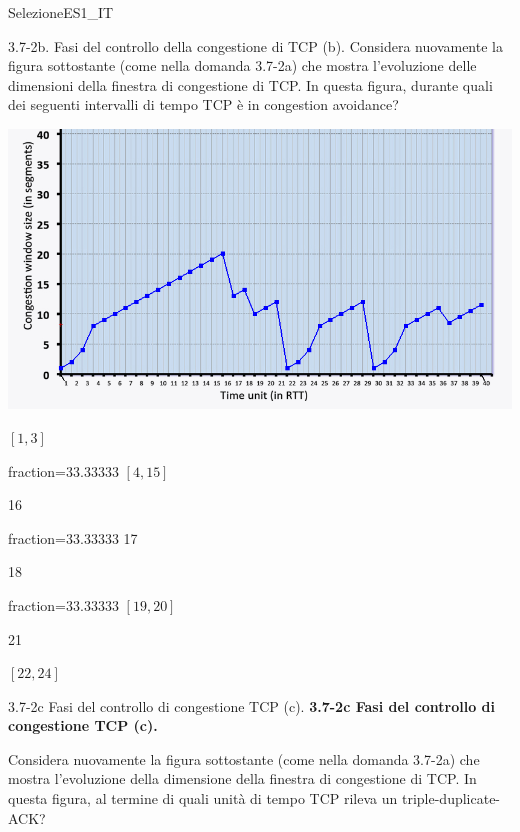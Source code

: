 \documentclass[a4paper]{article}
\begin{document}
\begin{quiz}{SelezioneES1\_IT}
\begin{multi}[points=1,shuffle,multiple]{3.7-2b. Fasi del controllo della congestione di TCP (b).}
Considera nuovamente la figura sottostante (come nella domanda 3.7-2a) che mostra l'evoluzione delle dimensioni della finestra di congestione di TCP. In questa figura, durante quali dei seguenti intervalli di tempo TCP è in congestion avoidance?

\begin{center}
	\includegraphics[width=\linewidth]{figs/tcp_cc_evolution.jpg}
\end{center}
\item $[1,3]$
\item[fraction=33.33333] $[4,15]$
\item 16
\item[fraction=33.33333] 17
\item 18
\item[fraction=33.33333] $[19,20]$
\item 21
\item $[22,24]$
\end{multi}

\begin{multi}[points=1,shuffle,multiple]{3.7-2c Fasi del controllo di congestione TCP (c).}
\textbf{3.7-2c Fasi del controllo di congestione TCP (c).} 

Considera nuovamente la figura sottostante (come nella domanda 3.7-2a) che mostra l'evoluzione della dimensione della finestra di congestione di TCP. In questa figura, al termine di quali unità di tempo TCP rileva un triple-duplicate-ACK?


\end{multi}
\end{quiz}
\end{document}

